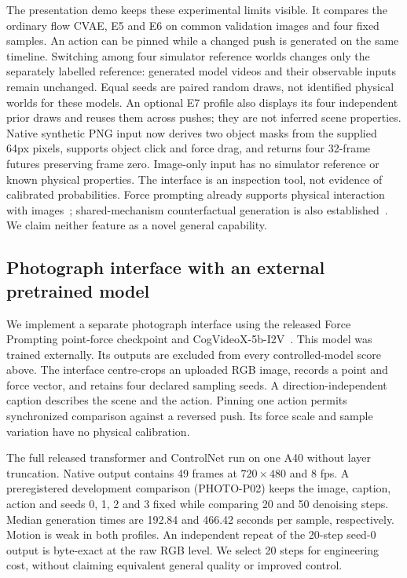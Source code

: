 \documentclass[11pt,a4paper]{article}
\begin{document}
The presentation demo keeps these experimental limits visible. It compares the ordinary flow CVAE, E5 and E6 on common validation images and four fixed samples. An action can be pinned while a changed push is generated on the same timeline. Switching among four simulator reference worlds changes only the separately labelled reference: generated model videos and their observable inputs remain unchanged. Equal seeds are paired random draws, not identified physical worlds for these models. An optional E7 profile also displays its four independent prior draws and reuses them across pushes; they are not inferred scene properties. Native synthetic PNG input now derives two object masks from the supplied 64px pixels, supports object click and force drag, and returns four 32-frame futures preserving frame zero. Image-only input has no simulator reference or known physical properties. The interface is an inspection tool, not evidence of calibrated probabilities. Force prompting already supports physical interaction with images~\cite{forceprompting}; shared-mechanism counterfactual generation is also established~\cite{oneworld}. We claim neither feature as a novel general capability.

\subsection{Photograph interface with an external pretrained model}
\label{sec:photo}
We implement a separate photograph interface using the released Force
Prompting point-force checkpoint and CogVideoX-5b-I2V~\cite{forceprompting}.
This model was trained externally. Its outputs are excluded from every
controlled-model score above. The interface centre-crops an uploaded RGB
image, records a point and force vector, and retains four declared sampling
seeds. A direction-independent caption describes the scene and the action.
Pinning one action permits synchronized comparison against a reversed push.
Its force scale and sample variation have no physical calibration.

The full released transformer and ControlNet run on one A40 without layer
truncation. Native output contains 49 frames at $720\times480$ and 8 fps.
A preregistered development comparison (PHOTO-P02) keeps the image, caption,
action and seeds 0, 1, 2 and 3 fixed while comparing 20 and 50 denoising steps.
Median generation times are 192.84 and 466.42 seconds per sample, respectively.
Motion is weak in both profiles. An independent repeat of the 20-step seed-0
output is byte-exact at the raw RGB level. We select 20 steps for engineering
cost, without claiming equivalent general quality or improved control.
\end{document}

